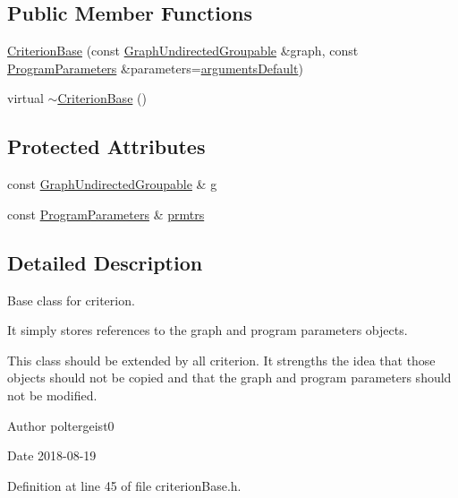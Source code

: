 \subsection*{Public Member Functions}
\begin{DoxyCompactItemize}
\item 
\hyperlink{classCriterionBase_a23370b412ce1e656415f77126e55f194}{Criterion\+Base} (const \hyperlink{classGraphUndirectedGroupable}{Graph\+Undirected\+Groupable} \&graph, const \hyperlink{structProgramParameters}{Program\+Parameters} \&parameters=\hyperlink{program_8h_ae2d819404495f80f31db7676c1329d19}{arguments\+Default})
\item 
virtual \hyperlink{classCriterionBase_a6787dc90e0ac605e3115949cb19f0867}{$\sim$\+Criterion\+Base} ()
\end{DoxyCompactItemize}
\subsection*{Protected Attributes}
\begin{DoxyCompactItemize}
\item 
const \hyperlink{classGraphUndirectedGroupable}{Graph\+Undirected\+Groupable} \& \hyperlink{classCriterionBase_a610fe9f207de420117ad25550c185f97}{g}
\item 
const \hyperlink{structProgramParameters}{Program\+Parameters} \& \hyperlink{classCriterionBase_a4253d177fc6e27cf675d541b116a1534}{prmtrs}
\end{DoxyCompactItemize}


\subsection{Detailed Description}
Base class for criterion. 

It simply stores references to the graph and program parameters objects.

This class should be extended by all criterion. It strengths the idea that those objects should not be copied and that the graph and program parameters should not be modified.

\begin{DoxyAuthor}{Author}
poltergeist0
\end{DoxyAuthor}
\begin{DoxyDate}{Date}
2018-\/08-\/19 
\end{DoxyDate}


Definition at line 45 of file criterion\+Base.\+h.



